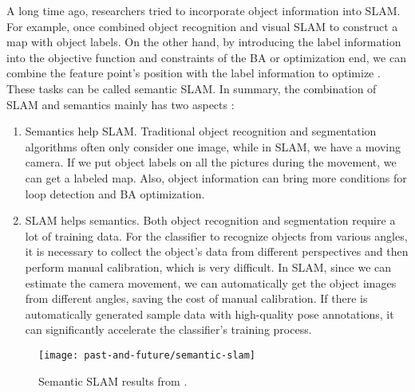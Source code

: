 A long time ago, researchers tried to incorporate object information into SLAM. For example, \cite{Nuechter2008, Civera2011, Koppula2011, Anand2012} once combined object recognition and visual SLAM to construct a map with object labels. On the other hand, by introducing the label information into the objective function and constraints of the BA or optimization end, we can combine the feature point's position with the label information to optimize {\cite{Fioraio2013}}. These tasks can be called semantic SLAM. In summary, the combination of SLAM and semantics mainly has two aspects {\cite{Cadena2016}}:

\begin{enumerate}
	\item Semantics help SLAM. Traditional object recognition and segmentation algorithms often only consider one image, while in SLAM, we have a moving camera. If we put object labels on all the pictures during the movement, we can get a labeled map. Also, object information can bring more conditions for loop detection and BA optimization.
	\item SLAM helps semantics. Both object recognition and segmentation require a lot of training data. For the classifier to recognize objects from various angles, it is necessary to collect the object's data from different perspectives and then perform manual calibration, which is very difficult. In SLAM, since we can estimate the camera movement, we can automatically get the object images from different angles, saving the cost of manual calibration. If there is automatically generated sample data with high-quality pose annotations, it can significantly accelerate the classifier's training process.
\end{enumerate}

\begin{figure}[!thp]
	\centering
	\texttt{[image: past-and-future/semantic-slam]}
	\caption{Semantic SLAM results from \cite{Anand2012, Salas-Moreno2014}.}
	\label{fig:semantic-slam}
\end{figure}


